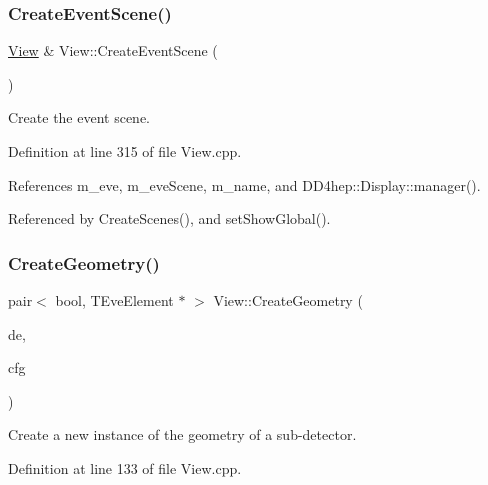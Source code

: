 \subsubsection{\texorpdfstring{Create\+Event\+Scene()}{CreateEventScene()}}
{\footnotesize\ttfamily \hyperlink{class_d_d4hep_1_1_view}{View} \& View\+::\+Create\+Event\+Scene (\begin{DoxyParamCaption}{ }\end{DoxyParamCaption})\hspace{0.3cm}{\ttfamily [virtual]}}



Create the event scene. 



Definition at line 315 of file View.\+cpp.



References m\+\_\+eve, m\+\_\+eve\+Scene, m\+\_\+name, and D\+D4hep\+::\+Display\+::manager().



Referenced by Create\+Scenes(), and set\+Show\+Global().

\hypertarget{class_d_d4hep_1_1_view_aa2325d2c428a2d2523bfb82cd31b7a28}{}\label{class_d_d4hep_1_1_view_aa2325d2c428a2d2523bfb82cd31b7a28} 
\subsubsection{\texorpdfstring{Create\+Geometry()}{CreateGeometry()}}
{\footnotesize\ttfamily pair$<$ bool, T\+Eve\+Element $\ast$ $>$ View\+::\+Create\+Geometry (\begin{DoxyParamCaption}\item[{\hyperlink{class_d_d4hep_1_1_view_a59eafc8150df21b918b964850ac6c462}{Det\+Element}}]{de,  }\item[{const \hyperlink{class_d_d4hep_1_1_display_configuration_1_1_config}{Display\+Configuration\+::\+Config} \&}]{cfg }\end{DoxyParamCaption})\hspace{0.3cm}{\ttfamily [virtual]}}



Create a new instance of the geometry of a sub-\/detector. 



Definition at line 133 of file View.\+cpp.



